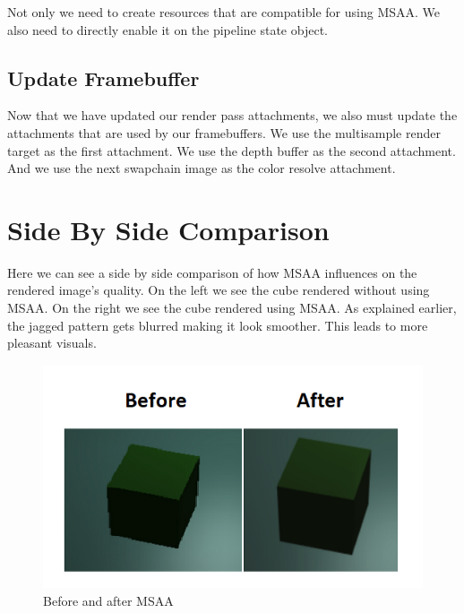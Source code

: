 Not only we need to create resources that are compatible for using MSAA.
We also need to directly enable it on the pipeline state object.

\begin{minipage}{\linewidth}{\noindent}
    
\end{minipage}

\subsection{Update Framebuffer}

Now that we have updated our render pass attachments, we also must update
the attachments that are used by our framebuffers.
We use the multisample render target as the first attachment.
We use the depth buffer as the second attachment.
And we use the next swapchain image as the color resolve attachment.

\section{Side By Side Comparison}

Here we can see a side by side comparison of how MSAA influences on the
rendered image's quality.
On the left we see the cube rendered without using MSAA.
On the right we see the cube rendered using MSAA.
As explained earlier, the jagged pattern gets blurred making it look
smoother.
This leads to more pleasant visuals.

\begin{figure}[H]
    \centering
    \includegraphics[scale=0.40]{images/ChMSAA/BeforeAfterMSAA.png}
    \caption{Before and after MSAA}
    \label{fig::MSAASideBySide}
\end{figure}
